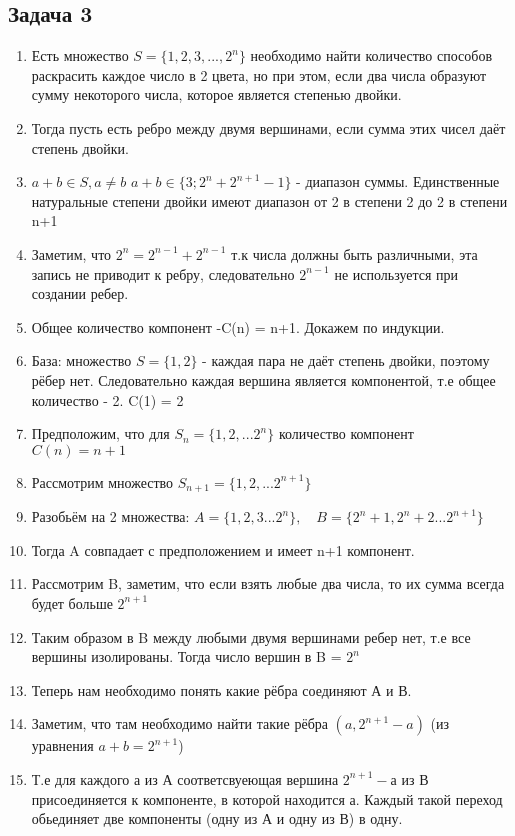 \documentclass[a4paper,12pt]{article}
\begin{document}
\subsection{Задача 3}
\begin{enumerate}
    \item Есть множество $S = \{1, 2, 3 ,..., 2^n\}$ необходимо найти количество способов раскрасить каждое число в 2 цвета, но при этом, если два числа образуют сумму некоторого числа, которое является степенью двойки.
    \item Тогда пусть есть ребро между двумя вершинами, если сумма этих чисел даёт степень двойки.
    \item $a+b \in S, a \ne b$ $a+b \in \{3; 2^n + 2^{n+1}-1\}$ - диапазон суммы. Единственные натуральные степени двойки имеют диапазон от 2 в степени 2 до 2 в степени n+1
    \item Заметим, что $2^n= 2^{n-1}+ 2^{n-1}$ т.к числа должны быть различными, эта запись не  приводит к ребру, следовательно $2^{n-1}$ не используется при создании ребер.
    \item Общее количество компонент -C(n) = n+1. Докажем по индукции.
    \item База: множество $S=\{1, 2\}$ - каждая пара не даёт степень двойки, поэтому рёбер нет. Следовательно каждая вершина является компонентой, т.е общее количество - 2. C(1) = 2
    \item Предположим, что для $S_{n}=\{1, 2, ... 2^{n}\}$ количество компонент $C(n) = n+1$
    \item Рассмотрим множество $S_{n+1}=\{1, 2, ... 2^{n+1}\}$
    \item Разобьём на 2 множества: $A=\{1,2,3...2^n\}, \quad B=\{2^n+1, 2^n+2 ... 2^{n+1}\}$
    \item Тогда A совпадает с предположением и имеет n+1 компонент.
    \item Рассмотрим B, заметим, что если взять любые два числа, то их сумма всегда будет больше $2^{n+1}$
    \item Таким образом в B между любыми двумя вершинами ребер нет, т.е все вершины изолированы. Тогда число вершин в B = $2^n$
    \item Теперь нам необходимо понять какие рёбра соединяют А и В.
    \item Заметим, что там необходимо найти такие рёбра $(a, 2^{n+1}-a)$  (из уравнения $a+b=2^{n+1}$)
    \item Т.е для каждого а из А соответсвуеющая вершина $2^{n+1}-а$ из В присоединяется к компоненте, в которой находится а. Каждый такой переход обьединяет две компоненты (одну из А и одну из В) в одну.

\end{enumerate}
\end{document}
